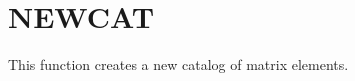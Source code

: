 \section{NEWCAT}
\label{sect:newcat}

\noindent This function creates a new catalog of matrix elements.\\

